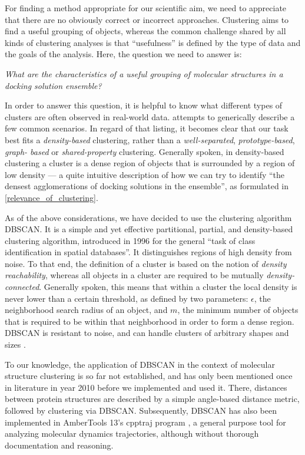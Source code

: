 For finding a method appropriate for our scientific aim, we need to appreciate
that there are no obviously correct or incorrect approaches. Clustering aims to
find a useful grouping of objects, whereas the common challenge shared by all
kinds of clustering analyses is that \enquote{usefulness} is defined by the type
of data and the goals of the analysis. Here, the question we need to answer is:

\begin{adjustwidth}{1.5cm}{1.5cm}
\textit{What are the characteristics of a useful grouping of
molecular structures in a docking solution ensemble?}
\end{adjustwidth}

In order to answer this question, it is helpful to know what different types of
clusters are often observed in real-world data. \cite{tan_data_mining} attempts
to generically describe a few common scenarios. In regard of that listing, it
becomes clear that our task best fits a \textit{density-based} clustering,
rather than a \textit{well-separated}, \textit{prototype-based}, \textit{graph-
based} or \textit{shared-property} clustering. Generally spoken, in
density-based clustering a cluster is a dense region of objects that is
surrounded by a region of low density --- a quite intuitive description of how
we can try to identify \enquote{the densest agglomerations of docking solutions
in the ensemble}, as formulated in \cref{relevance_of_clustering}.

As of the above considerations, we have decided to use the clustering algorithm
DBSCAN. It is a simple and yet effective partitional, partial, and density-based
clustering algorithm, introduced in 1996 \cite{dbscan_ester1996} for the general
\enquote{task of class identification in spatial databases}. It distinguishes
regions of high density from noise. To that end, the definition of a cluster is
based on the notion of \textit{density reachability}, whereas all objects in a
cluster are required to be mutually \textit{density-connected}. Generally
spoken, this means that within a cluster the local density is never lower than a
certain threshold, as defined by two parameters: $\epsilon$, the neighborhood
search radius of an object, and $m$, the minimum number of objects that is
required to be within that neighborhood in order to form a dense region. DBSCAN
is resistant to noise, and can handle clusters of arbitrary shapes and sizes
\cite{dbscan_ester1996}.

To our knowledge, the application of DBSCAN in the context of molecular
structure clustering is so far not established, and has only been mentioned once
in literature in year 2010 \cite{dbscan_usage_proteinstructures_2010} before we
implemented and used it. There, distances between protein structures are
described by a simple angle-based distance metric, followed by clustering via
DBSCAN. Subsequently, DBSCAN has also been implemented in AmberTools 13's
cpptraj program \cite{cpptraj_2013}, a general purpose tool for analyzing
molecular dynamics trajectories, although without thorough documentation and
reasoning.



